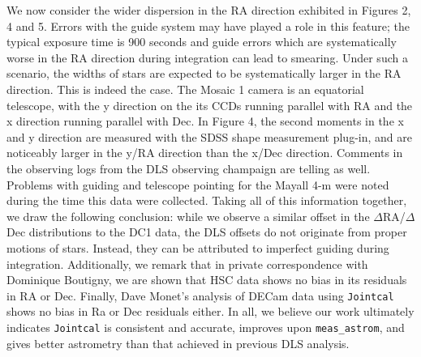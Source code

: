 \documentclass[modern]{aastex61}
\begin{document}
We now consider the wider dispersion in the RA direction exhibited in Figures 2, 4 and 5. Errors with the guide system may have played a role in this feature; the typical exposure time is 900 seconds and guide errors which are systematically worse in the RA direction during integration can lead to smearing. Under such a scenario, the widths of stars are expected to be systematically larger in the RA direction. 
This is indeed the case. The Mosaic 1 camera is an equatorial telescope, with the y direction on the its CCDs running parallel with RA and the x direction running parallel with Dec. In Figure 4, the second moments in the x and y direction are measured with the SDSS shape measurement plug-in, and are noticeably larger in the y/RA direction than the x/Dec direction. 
Comments in the observing logs from the DLS observing champaign are telling as well. Problems with guiding and telescope pointing for the Mayall 4-m were noted during the time this data were collected. Taking all of this information together, we draw the following conclusion: while we observe a similar offset in the $\Delta$RA/$\Delta$Dec distributions to the DC1 data, the DLS offsets do not originate from proper motions of stars. Instead, they can be attributed to imperfect guiding during integration. Additionally, we remark that in private correspondence with Dominique Boutigny, we are shown that HSC data shows no bias in its residuals in RA or Dec. Finally, Dave Monet's analysis of DECam data using {\tt\string Jointcal} shows no bias in Ra or Dec residuals either.
In all, we believe our work ultimately indicates {\tt\string Jointcal} is consistent and accurate, improves upon {\tt\string meas\_astrom}, and gives better astrometry than that achieved in previous DLS analysis. 
\end{document}

